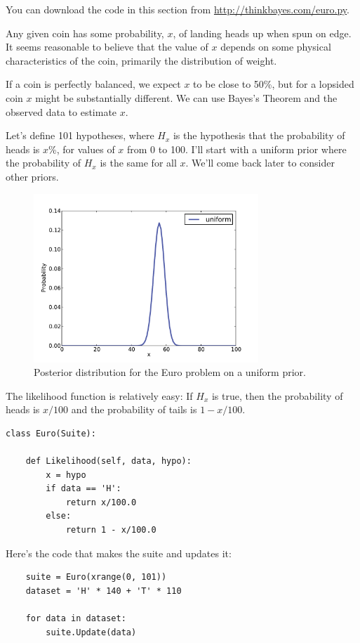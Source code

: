 \documentclass[12pt]{book}
\begin{document}
You can download the code in this section from
\url{http://thinkbayes.com/euro.py}.

Any given coin has some probability, $x$, of landing heads up when spun
on edge.  It seems reasonable to believe that the value of $x$ depends
on some physical characteristics of the coin, primarily the distribution
of weight.

If a coin is perfectly balanced, we expect $x$ to be close to 50\%, but
for a lopsided coin $x$ might be substantially different.  We can use
Bayes's Theorem and the observed data to estimate $x$.

Let's define 101 hypotheses, where $H_x$ is the hypothesis that the
probability of heads is $x$\%, for values of $x$ from 0 to 100.  I'll
start with a uniform prior where the probability of $H_x$ is the same
for all $x$.  We'll come back later to consider other priors.

\begin{figure}
\centerline{\includegraphics[height=2.5in]{figs/euro1.pdf}}
\caption{Posterior distribution for the Euro problem
on a uniform prior.}
\label{fig.euro1}
\end{figure}

The likelihood function is relatively easy: If $H_x$ is true, then the
probability of heads is $x/100$ and the probability of tails is $1-
x/100$.

\begin{verbatim}
class Euro(Suite):

    def Likelihood(self, data, hypo):
        x = hypo
        if data == 'H':
            return x/100.0
        else:
            return 1 - x/100.0
\end{verbatim}

Here's the code that makes the suite and updates it:

\begin{verbatim}
    suite = Euro(xrange(0, 101))
    dataset = 'H' * 140 + 'T' * 110

    for data in dataset:
        suite.Update(data)
\end{verbatim}
\end{document}
